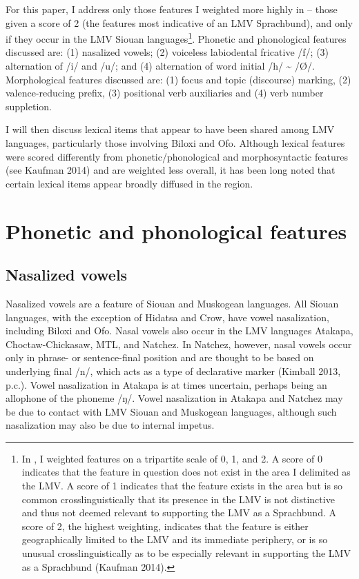 \documentclass[output=paper]{LSP/langsci}
\begin{document}
For this paper, I address only those features I weighted more highly in \citet{Kaufman2014} -- those given a score of 2 (the features most indicative of an LMV Sprachbund), and only if they occur in the LMV Siouan languages\footnote{In \citet{Kaufman2014}, I weighted features on a tripartite scale of 0, 1, and 2. A score of 0 indicates that the feature in question does not exist in the area I delimited as the LMV. A score of 1 indicates that the feature exists in the area but is so common crosslinguistically that its presence in the LMV is not distinctive and thus not deemed relevant to supporting the LMV as a Sprachbund. A score of 2, the highest weighting, indicates that the feature is either geographically limited to the LMV and its immediate periphery, or is so unusual crosslinguistically as to be especially relevant in supporting the LMV as a Sprachbund (Kaufman 2014).}. Phonetic and phonological features discussed are: (1) nasalized vowels; (2) voiceless labiodental fricative /f/; (3) alternation of /i/ and /u/; and (4) alternation of word initial /h/ \textasciitilde{} /Ø/. Morphological features discussed are: (1) focus and topic (discourse) marking, (2) valence-reducing prefix, (3) positional verb auxiliaries and (4) verb number suppletion. 

I will then discuss lexical items that appear to have been shared among LMV languages, particularly those involving Biloxi and Ofo. Although lexical features were scored differently from phonetic/phonological and morphosyntactic features (see Kaufman 2014) and are weighted less overall, it has been long noted that certain lexical items appear broadly diffused in the region. 

\section{Phonetic and phonological features}

\subsection{Nasalized vowels}

Nasalized vowels are a feature of Siouan and Muskogean languages. All Siouan languages, with the exception of Hidatsa and Crow, have vowel nasalization, including Biloxi and Ofo. Nasal vowels also occur in the LMV languages Atakapa, Choctaw-Chickasaw, MTL, and Natchez. In Natchez, however, nasal vowels occur only in phrase- or sentence-final position and are thought to be based on underlying final /n/, which acts as a type of declarative marker (Kimball 2013, p.c.). Vowel nasalization in Atakapa is at times uncertain, perhaps being an allophone of the phoneme /ŋ/. Vowel nasalization in Atakapa and Natchez may be due to contact with LMV Siouan and Muskogean languages, although such nasalization may also be due to internal impetus.
\end{document}
